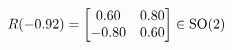 \documentclass[preview]{standalone}
\begin{document}
\begin{align*}
\special{dvisvgm:raw <g id='unique000'>}R(-0.92) = \begin{bmatrix} 0.60 & 0.80 \\ -0.80 & 0.60 \end{bmatrix} \in \text{SO}(2)\special{dvisvgm:raw </g>}
\end{align*}
\end{document}
